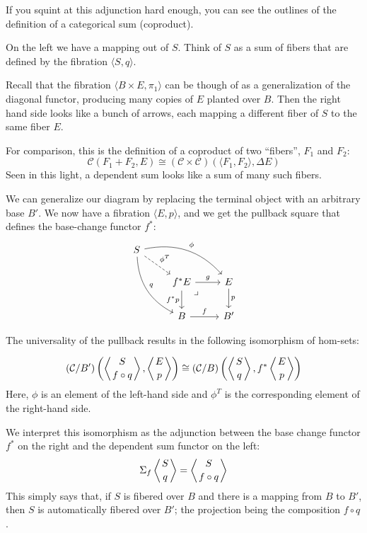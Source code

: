 \documentclass[DaoFP]{subfiles}
\begin{document}
If you squint at this adjunction hard enough, you can see the outlines of the definition of a categorical sum (coproduct). 

On the left we have a mapping out of $S$. Think of $S$ as a sum of fibers that are defined by the fibration $\langle S, q \rangle$. 

Recall that the fibration $\langle B \times E, \pi_1 \rangle$ can be though of as a generalization of the diagonal functor, producing many copies of $E$ planted over $B$. Then the right hand side looks like a bunch of arrows, each mapping a different fiber of $S$ to the same fiber $E$. 

For comparison, this is the definition of a coproduct of two ``fibers'', $F_1$ and $F_2$:
\[ \mathcal{C}(F_1 + F_2, E) \cong (\mathcal{C} \times \mathcal{C}) (\langle F_1, F_2 \rangle, \Delta E) \]
Seen in this light, a dependent sum looks like a sum of many such fibers.

We can generalize our diagram by replacing the terminal object with an arbitrary base $B'$. We now have a fibration $\langle E, p \rangle$, and we get the pullback square that defines the base-change functor $f^*$:
\[
 \begin{tikzcd}
 S
 \arrow[dr, dashed, "\phi^T"]
 \arrow[drr, bend left, "\phi"]
 \arrow[ddr, bend right, "q"]
 \\
 &f^* E
\arrow[dr, phantom,  , very near start, "\lrcorner"]
 \arrow[r, "g"]
 \arrow[d, "f^* p"']
 &E
 \arrow[d, "p"]
 \\
 &B
 \arrow[r, "f"]
 &B'
  \end{tikzcd}
\]

The universality of the pullback results in the following isomorphism of hom-sets:

\[ (\mathcal{C}/B') \left( \left \langle {S \atop f \circ q } \right \rangle , \left \langle {E \atop p} \right \rangle \right)  \cong   (\mathcal{C}/B) \left( \left \langle {S \atop q} \right \rangle , f^* \left \langle {E \atop p} \right \rangle \right)\]
Here, $\phi$ is an element of the left-hand side and $\phi^T$ is the corresponding element of the right-hand side. 

We interpret this isomorphism as the adjunction between the base change functor $f^*$ on the right and the dependent sum functor on the left:
\[ \Sigma_f \left \langle {S \atop q} \right \rangle =  \left \langle {S \atop f \circ q} \right \rangle \]
This simply says that, if $S$ is fibered over $B$ and there is a mapping from $B$ to $B'$, then $S$ is automatically fibered over $B'$; the projection being the composition $f \circ q$. 
\end{document}
